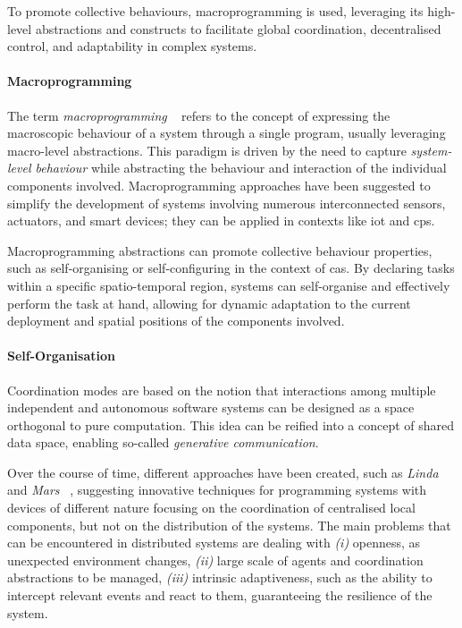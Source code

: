To promote collective behaviours, macroprogramming is used, leveraging its high-level abstractions and constructs to
facilitate global coordination, decentralised control, and adaptability in complex systems.

\paragraph{Macroprogramming}
The term \emph{macroprogramming} ~\cite{10.1145/3579353} refers to the concept of expressing the macroscopic behaviour of a system through a single
program, usually leveraging macro-level abstractions.
This paradigm is driven by the need to capture \emph{system-level behaviour} while abstracting the behaviour and interaction
of the individual components involved.
Macroprogramming approaches have been suggested to simplify the development of systems involving numerous interconnected
sensors, actuators, and smart devices; they can be applied in contexts like \ac{iot} and \ac{cps}.

Macroprogramming abstractions can promote collective behaviour properties, such as self-organising or self-configuring in
the context of \ac{cas}.
By declaring tasks within a specific spatio-temporal region, systems can self-organise and effectively perform the task
at hand, allowing for dynamic adaptation to the current deployment and spatial positions of the components involved.

\paragraph{Self-Organisation}
Coordination modes are based on the notion that interactions among multiple independent and autonomous software systems
can be designed as a space orthogonal to pure computation.
This idea can be reified into a concept of shared data space, enabling so-called \emph{generative communication}.

Over the course of time, different approaches have been created, such as \emph{Linda} ~\cite{10.1145/2363.2433} and \emph{Mars} ~\cite{865084},
suggesting innovative techniques for programming systems with devices of different nature focusing on the coordination
of centralised local components, but not on the distribution of the systems.
The main problems that can be encountered in distributed systems are dealing with
    \emph{(i)} openness, as unexpected environment changes,
    \emph{(ii)} large scale of agents and coordination abstractions to be managed,
    \emph{(iii)} intrinsic adaptiveness, such as the ability to intercept relevant events and react to them, guaranteeing
        the resilience of the system.

